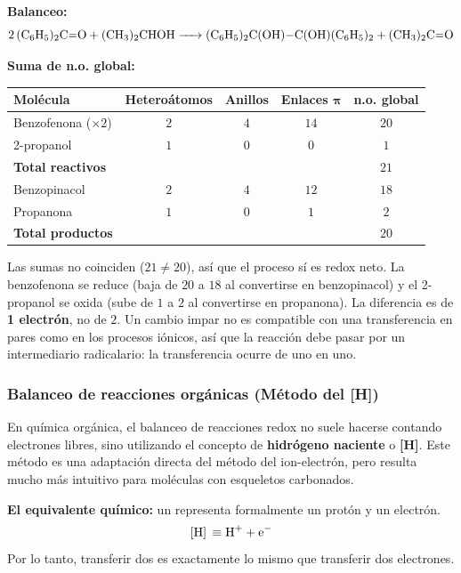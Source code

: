 \textbf{Balanceo:}
\[
\ce{2 (C6H5)2C=O + (CH3)2CHOH -> (C6H5)2C(OH)-C(OH)(C6H5)2 + (CH3)2C=O}
\]

\textbf{Suma de n.o. global:}
\begin{center}
\renewcommand{\arraystretch}{1.4}
\begin{tabular}{lcccc}
\hline
\textbf{Molécula} & \textbf{Heteroátomos} & \textbf{Anillos} & \textbf{Enlaces }$\boldsymbol{\pi}$ & \textbf{n.o. global} \\
\hline
Benzofenona ($\times 2$) & $2$ & $4$ & $14$ & $20$ \\
2-propanol & $1$ & $0$ & $0$ & $1$ \\
\hline
\textbf{Total reactivos} & & & & $21$ \\
\hline
Benzopinacol & $2$ & $4$ & $12$ & $18$ \\
Propanona & $1$ & $0$ & $1$ & $2$ \\
\hline
\textbf{Total productos} & & & & $20$ \\
\hline
\end{tabular}
\end{center}

Las sumas no coinciden ($21 \neq 20$), así que el proceso sí es redox 
neto. La benzofenona se reduce (baja de $20$ a $18$ al convertirse en 
benzopinacol) y el 2-propanol se oxida (sube de $1$ a $2$ al convertirse 
en propanona). La diferencia es de \textbf{1 electrón}, no de $2$. Un 
cambio impar no es compatible con una transferencia en pares como en los 
procesos iónicos, así que la reacción debe pasar por un intermediario 
radicalario: la transferencia ocurre de uno en uno.

{}
\subsubsection*{\textcolor{blueunam}{Balanceo de reacciones orgánicas (Método del [H])}}

En química orgánica, el balanceo de reacciones redox no suele hacerse contando electrones libres, sino utilizando el concepto de \textbf{hidrógeno naciente} o \textbf{[H]}. Este método es una adaptación directa del método del ion-electrón, pero resulta mucho más intuitivo para moléculas con esqueletos carbonados.

\textbf{El equivalente químico:} un \ce{[H]} representa formalmente un protón y un electrón.
\[
\ce{[H] \equiv H+ + e-}
\]
Por lo tanto, transferir dos \ce{[H]} es exactamente lo mismo que transferir dos electrones.

